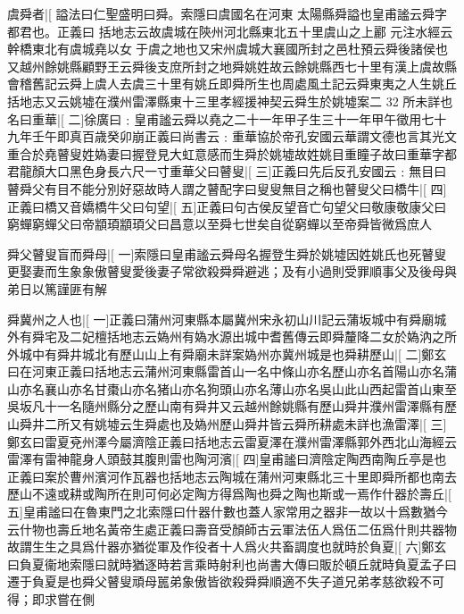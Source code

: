 虞舜者|[%
謚法曰仁聖盛明曰舜。索隱曰虞國名在河東%
太陽縣舜謚也皇甫謐云舜字都君也。正義曰%
%
括地志云故虞城在陝州河北縣東北五十里虞山之上酈%
元注水經云幹橋東北有虞城堯以女𡣕于虞之地也又宋州虞城大襄國所封之邑杜預云舜後諸侯也又越州餘姚縣顧野王云舜後支庶所封之地舜姚姓故云餘姚縣西七十里有漢上虞故縣會稽舊記云舜上虞人去虞三十里有姚丘即舜所生也周處風土記云舜東夷之人生姚丘括地志又云姚墟在濮州雷澤縣東十三里孝經援神契云舜生於姚墟案二
32
所未詳也名曰重華|[%
二]徐廣曰﹕皇甫謐云舜以堯之二十一年甲子生三十一年甲午徵用七十九年壬午即真百歳癸卯崩正義曰尚書云﹕重華協於帝孔安國云華謂文德也言其光文重合於堯瞽叟姓媯妻曰握登見大虹意感而生舜於姚墟故姓姚目重瞳子故曰重華字都君龍顏大口黑色身長六尺一寸重華父曰瞽叟|[%
三]正義曰先后反孔安國云﹕無目曰瞽舜父有目不能分別好惡故時人謂之瞽配字曰叟叟無目之稱也瞽叟父曰橋牛|[%
四]正義曰橋又音嬌橋牛父曰句望|[%
五]正義曰句古侯反望音亡句望父曰敬康敬康父曰窮蟬窮蟬父曰帝顓頊顓頊父曰昌意以至舜七世矣自從窮蟬以至帝舜皆微爲庶人

舜父瞽叟盲而舜母|[%
一]索隱曰皇甫謐云舜母名握登生舜於姚墟因姓姚氏也死瞽叟更娶妻而生象象傲瞽叟愛後妻子常欲殺舜舜避逃；及有小過則受罪順事父及後母與弟日以篤謹匪有解

舜冀州之人也|[%
一]正義曰蒲州河東縣本屬冀州宋永初山川記云蒲坂城中有舜廟城外有舜宅及二妃檀括地志云媯州有媯水源出城中耆舊傳云即舜釐降二女於媯汭之所外城中有舜井城北有歷山山上有舜廟未詳案媯州亦冀州城是也舜耕歷山|[%
二]鄭玄曰在河東正義曰括地志云蒲州河東縣雷首山一名中條山亦名歷山亦名首陽山亦名蒲山亦名襄山亦名甘棗山亦名猪山亦名狗頭山亦名薄山亦名吳山此山西起雷首山東至吳坂凡十一名隨州縣分之歷山南有舜井又云越州餘姚縣有歷山舜井濮州雷澤縣有歷山舜井二所又有姚墟云生舜處也及媯州歷山舜井皆云舜所耕處未詳也漁雷澤|[%
三]鄭玄曰雷夏兗州澤今屬濟陰正義曰括地志云雷夏澤在濮州雷澤縣郭外西北山海經云雷澤有雷神龍身人頭鼓其腹則雷也陶河濱|[%
四]皇甫謐曰濟陰定陶西南陶丘亭是也正義曰案於曹州濱河作瓦器也括地志云陶城在蒲州河東縣北三十里即舜所都也南去歷山不遠或耕或陶所在則可何必定陶方得爲陶也舜之陶也斯或一焉作什器於壽丘|[%
五]皇甫謐曰在魯東門之北索隱曰什器什數也蓋人家常用之器非一故以十爲數猶今云什物也壽丘地名黃帝生處正義曰壽音受顏師古云軍法伍人爲伍二伍爲什則共器物故謂生生之具爲什器亦猶從軍及作役者十人爲火共畜調度也就時於負夏|[%
六]鄭玄曰負夏衞地索隱曰就時猶逐時若言乘時射利也尚書大傳曰販於頓丘就時負夏孟子曰遷于負夏是也舜父瞽叟頑母嚚弟象傲皆欲殺舜舜順適不失子道兄弟孝慈欲殺不可得；即求嘗在側

